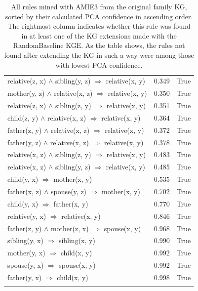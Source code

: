 \begin{longtable}{lrl}
 relative(z, x) $\wedge$ sibling(y, z)   $\Rightarrow$ relative(x, y) &           0.349 &                     True \\
  mother(y, z) $\wedge$ relative(x, z)   $\Rightarrow$ relative(x, y) &           0.350 &                     True \\
 relative(z, x) $\wedge$ sibling(z, y)   $\Rightarrow$ relative(x, y) &           0.351 &                     True \\
   child(z, y) $\wedge$ relative(x, z)   $\Rightarrow$ relative(x, y) &           0.364 &                     True \\
  father(z, y) $\wedge$ relative(x, z)   $\Rightarrow$ relative(x, y) &           0.372 &                     True \\
  father(y, z) $\wedge$ relative(x, z)   $\Rightarrow$ relative(x, y) &           0.378 &                     True \\
 relative(x, z) $\wedge$ sibling(z, y)   $\Rightarrow$ relative(x, y) &           0.483 &                     True \\
 relative(x, z) $\wedge$ sibling(y, z)   $\Rightarrow$ relative(x, y) &           0.485 &                     True \\
                       child(y, x)   $\Rightarrow$ mother(x, y) &           0.535 &                     True \\
      father(x, z) $\wedge$ spouse(y, z)   $\Rightarrow$ mother(x, y) &           0.702 &                     True \\
                       child(y, x)   $\Rightarrow$ father(x, y) &           0.770 &                     True \\
                  relative(y, x)   $\Rightarrow$ relative(x, y) &           0.846 &                     True \\
      father(z, y) $\wedge$ mother(z, x)   $\Rightarrow$ spouse(x, y) &           0.968 &                     True \\
                    sibling(y, x)   $\Rightarrow$ sibling(x, y) &           0.990 &                     True \\
                       mother(y, x)   $\Rightarrow$ child(x, y) &           0.992 &                     True \\
                      spouse(y, x)   $\Rightarrow$ spouse(x, y) &           0.992 &                     True \\
                       father(y, x)   $\Rightarrow$ child(x, y) &           0.998 &                     True \\
\bottomrule
\caption{All rules mined with AMIE3 from the original family KG, sorted by their calculated PCA confidence in ascending order. The rightmost column indicates whether this rule was found in at least one of the KG extensions made with the RandomBaseline KGE. As the table shows, the rules not found after extending the KG in such a way were among those with lowest PCA confidence.}
\label{original_rules_found_by_baseline_family}
\end{longtable}


